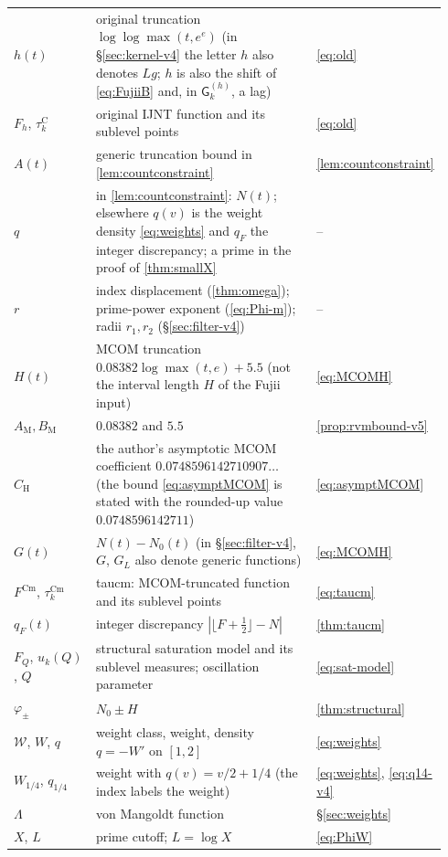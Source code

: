 \documentclass[11pt,a4paper]{article}
\numberwithin{equation}{section}
\theoremstyle{definition}
\theoremstyle{remark}
\newcommand{\Cm}{\mathrm{Cm}}
\begin{document}
\begin{longtable}{@{}p{0.22\linewidth}p{0.56\linewidth}p{0.16\linewidth}@{}}
$h(t)$ & original truncation $\log\log\max(t,e^e)$ (in \S\ref{sec:kernel-v4} the letter $h$ also denotes $Lg$; $h$ is also the shift of \eqref{eq:FujiiB} and, in $\mathsf G_k^{(h)}$, a lag) & \eqref{eq:old}\\
$F_h$, $\tau_k^{\mathrm C}$ & original IJNT function and its sublevel points & \eqref{eq:old}\\
$A(t)$ & generic truncation bound in \cref{lem:countconstraint} & \cref{lem:countconstraint}\\
$q$ & in \cref{lem:countconstraint}: $N(t)$; elsewhere $q(v)$ is the weight density \eqref{eq:weights} and $q_F$ the integer discrepancy; a prime in the proof of \cref{thm:smallX} & --\\
$r$ & index displacement (\cref{thm:omega}); prime-power exponent (\eqref{eq:Phi-m}); radii $r_1,r_2$ (\S\ref{sec:filter-v4}) & --\\
$H(t)$ & MCOM truncation $0.08382\log\max(t,e)+5.5$ (not the interval length $H$ of the Fujii input) & \eqref{eq:MCOMH}\\
$A_{\mathrm M},B_{\mathrm M}$ & $0.08382$ and $5.5$ & \cref{prop:rvmbound-v5}\\
$C_{\mathrm H}$ & the author's asymptotic MCOM coefficient $0.0748596142710907\ldots$ (the bound \eqref{eq:asymptMCOM} is stated with the rounded-up value $0.0748596142711$) & \eqref{eq:asymptMCOM}\\
$G(t)$ & $N(t)-N_0(t)$ (in \S\ref{sec:filter-v4}, $G$, $G_L$ also denote generic functions) & \eqref{eq:MCOMH}\\
$F^{\Cm}$, $\tau_k^{\Cm}$ & taucm: MCOM-truncated function and its sublevel points & \eqref{eq:taucm}\\
$q_F(t)$ & integer discrepancy $|\lfloor F+\frac12\rfloor-N|$ & \cref{thm:taucm}\\
$F_Q$, $u_k(Q)$, $Q$ & structural saturation model and its sublevel measures; oscillation parameter & \eqref{eq:sat-model}\\
$\varphi_\pm$ & $N_0\pm H$ & \cref{thm:structural}\\
$\mathcal W$, $W$, $q$ & weight class, weight, density $q=-W'$ on $[1,2]$ & \eqref{eq:weights}\\
$W_{1/4}$, $q_{1/4}$ & weight with $q(v)=v/2+1/4$ (the index labels the weight) & \eqref{eq:weights}, \eqref{eq:q14-v4}\\
$\Lambda$ & von Mangoldt function & \S\ref{sec:weights}\\
$X$, $L$ & prime cutoff; $L=\log X$ & \eqref{eq:PhiW}\\

\end{longtable}
\end{document}
